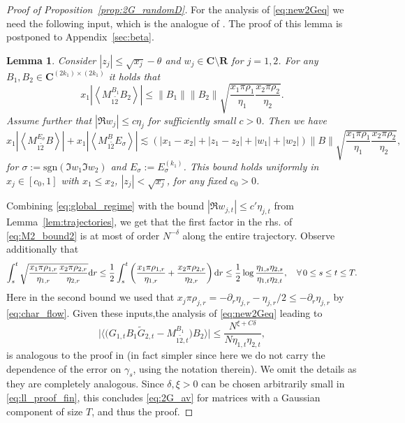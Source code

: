 \documentclass[10pt]{amsart}
\newtheorem{lemma}[theorem]{Lemma}
\numberwithin{equation}{section}
\newcommand{\nc}{\normalcolor}
\newcommand{\dif}{\mathrm{d}}
\newcommand{\R}{\mathbf{R}}
\newcommand{\C}{\mathbf{C}}
\begin{document}
\begin{proof}[Proof of Proposition~\ref{prop:2G_randomD}]
For the analysis of \eqref{eq:new2Geq} we need the following input, which is the analogue of \cite[Eq.(4.27)]{nonHermdecay}. The proof of this lemma is postponed to Appendix~\ref{sec:beta}.
 
\begin{lemma}\label{lem:M2_bound} Consider $|z_j|\le\sqrt{x_j}-\theta$ and $w_j\in \C\setminus\R$ for $j=1,2$. For any $B_1,B_2\in\C^{(2k_1)\times (2k_1)}$ it holds that
\begin{equation}
x_1\left\vert\left\langle M_{1\widetilde{2}}^{B_1}B_2\right\rangle\right\vert \le \|B_1\|\|B_2\|\sqrt{\frac{x_1\pi\rho_1}{\eta_1}\frac{x_2\pi\rho_2}{\eta_2}}.
\label{eq:M2_bound1}
\end{equation}
Assume further that $|\Re w_j|\le c\eta_j$ for sufficiently small $c>0$. Then we have
\begin{equation}
x_1\left\vert \left\langle M_{1\widetilde{2}}^{E_\sigma}B\right\rangle\right\vert + x_1\left\vert \left\langle M_{1\widetilde{2}}^{B}E_\sigma\right\rangle\right\vert \lesssim \left(|x_1-x_2|+|z_1-z_2|+|w_1|+|w_2|\right)\|B\|\sqrt{\frac{x_1\pi\rho_1}{\eta_1}\frac{x_2\pi\rho_2}{\eta_2}},
\label{eq:M2_bound2}
\end{equation}
for $\sigma:=\mathrm{sgn}(\Im w_1\Im w_2)$ and $E_\sigma:=E_\sigma^{(k_1)}$. This bound holds uniformly in $x_j\in [c_0,1]$ with $x_1\le x_2$, $|z_j|< \sqrt{x_j}$, for any fixed $c_0>0$.
\end{lemma}

Combining \eqref{eq:global_regime} with the bound $|\Re w_{j,t}|\le c'\eta_{j,t}$ from Lemma~\ref{lem:trajectories}, we get that  the first factor in the rhs. of \eqref{eq:M2_bound2} is at most of order $N^{-\delta}$ along the entire trajectory. Observe additionally that 
\begin{equation}
\int_s^t \sqrt{\frac{x_1\pi\rho_{1,r}}{\eta_{1,r}}\frac{x_2\pi\rho_{2,r}}{\eta_{2,r}}}\dif r \le  \frac{1}{2}\int_s^t \left(\frac{x_1\pi\rho_{1,r}}{\eta_{1,r}}+ \frac{x_2\pi\rho_{2,r}}{\eta_{2,r}}\right)\dif r \nc \le\frac{1}{2}\log \frac{\eta_{1,s}\eta_{2,s}}{\eta_{1,t}\eta_{2,t}},\quad \forall\, 0\le s\le t\le T.
\end{equation}
Here in the second bound we used that $x_j\pi\rho_{j,r}=-\partial_r \eta_{j,r}-\eta_{j,r}/2\le-\partial_r \eta_{j,r}$ by \eqref{eq:char_flow}. \nc Given these inputs,the analysis of \eqref{eq:new2Geq} leading to
\begin{equation}
\big\vert\big\langle \big(G_{1,t}B_1\widetilde{G}_{2,t} - M_{1\widetilde{2},t}^{B_1}\big)B_2\big\rangle\big\vert \le \frac{N^{\xi+C\delta}}{N\eta_{1,t}\eta_{2,t}},
\label{eq:ll_proof_fin}
\end{equation}
is analogous to the proof in \cite[Proposition~4.3]{nonHermdecay} (in fact simpler since here we do not carry the dependence of the error on $\gamma_s$, using the notation therein). We omit the details as they are completely analogous. Since $\delta,\xi>0$ can be chosen arbitrarily small in \eqref{eq:ll_proof_fin}, this concludes \eqref{eq:2G_av} for matrices with a Gaussian component of size $T$, and thus the proof.
\end{proof}
\end{document}
